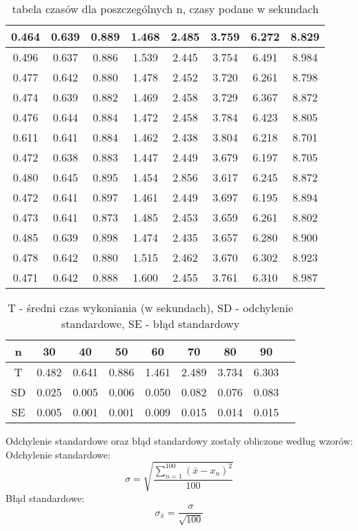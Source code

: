 \begin{table}[H]
\begin{tabular}{|c|c|c|c|c|c|c|c|}
      0.464 & 0.639 & 0.889 & 1.468 & 2.485 & 3.759 & 6.272 & 8.829 \\ \hline
      0.496 & 0.637 & 0.886 & 1.539 & 2.445 & 3.754 & 6.491 & 8.984 \\ \hline
      0.477 & 0.642 & 0.880 & 1.478 & 2.452 & 3.720 & 6.261 & 8.798 \\ \hline
      0.474 & 0.639 & 0.882 & 1.469 & 2.458 & 3.729 & 6.367 & 8.872 \\ \hline
      0.476 & 0.644 & 0.884 & 1.472 & 2.458 & 3.784 & 6.423 & 8.805 \\ \hline
      0.611 & 0.641 & 0.884 & 1.462 & 2.438 & 3.804 & 6.218 & 8.701 \\ \hline
      0.472 & 0.638 & 0.883 & 1.447 & 2.449 & 3.679 & 6.197 & 8.705 \\ \hline
      0.480 & 0.645 & 0.895 & 1.454 & 2.856 & 3.617 & 6.245 & 8.872 \\ \hline
      0.472 & 0.641 & 0.897 & 1.461 & 2.449 & 3.697 & 6.195 & 8.894 \\ \hline
      0.473 & 0.641 & 0.873 & 1.485 & 2.453 & 3.659 & 6.261 & 8.802 \\ \hline
      0.485 & 0.639 & 0.898 & 1.474 & 2.435 & 3.657 & 6.280 & 8.900 \\ \hline
      0.478 & 0.642 & 0.880 & 1.515 & 2.462 & 3.670 & 6.302 & 8.923 \\ \hline
      0.471 & 0.642 & 0.888 & 1.600 & 2.455 & 3.761 & 6.310 & 8.987 \\ \hline
  \end{tabular}
  \caption{tabela czasów dla poszczególnych n, czasy podane w sekundach}
\end{table}

\begin{table}[H]
  \centering
  \begin{tabular}{|c||c|c|c|c|c|c|c|c| }
  \hline
  n & 30 & 40 & 50 & 60 & 70 & 80 & 90 \\ \hline \hline
  T & 0.482 & 0.641 & 0.886 & 1.461 & 2.489 & 3.734 & 6.303 \\ \hline
  SD & 0.025 & 0.005 & 0.006 & 0.050 & 0.082 & 0.076 & 0.083 \\ \hline
  SE & 0.005 & 0.001 & 0.001 & 0.009 & 0.015 & 0.014 & 0.015 \\ \hline
  \end{tabular}
  \caption{T - średni czas wykoniania (w sekundach), SD - odchylenie standardowe, SE - błąd standardowy}
\end{table}

Odchylenie standardowe oraz błąd standardowy zostały obliczone według wzorów: \\
Odchylenie standardowe:
\[ \sigma = \sqrt{\frac{\sum_{n = 1}^{100}(\bar{x} - x_n)^2}{100}} \]
Błąd standardowe:
\[ \sigma_{\bar{x}} = \frac{\sigma}{\sqrt{100}} \]

